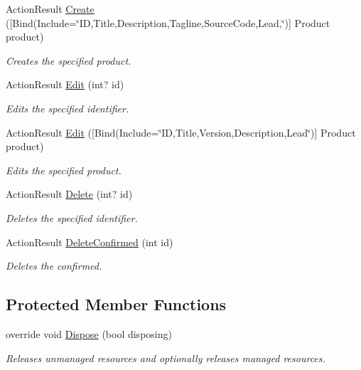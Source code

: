 \begin{DoxyCompactItemize}
Action\+Result \hyperlink{class_open_1_1_g_i_1_1hypermart_1_1_controllers_1_1_products_controller_aa3e20739b645a820cfea38aae81aff6a}{Create} (\mbox{[}Bind(Include=\char`\"{}ID,Title,Description,Tagline,Source\+Code,Lead,\char`\"{})\mbox{]} Product product)
\begin{DoxyCompactList}\small\item\em Creates the specified product. \end{DoxyCompactList}\item 
Action\+Result \hyperlink{class_open_1_1_g_i_1_1hypermart_1_1_controllers_1_1_products_controller_a203586ae68a295df5c7a037601e4b87a}{Edit} (int? id)
\begin{DoxyCompactList}\small\item\em Edits the specified identifier. \end{DoxyCompactList}\item 
Action\+Result \hyperlink{class_open_1_1_g_i_1_1hypermart_1_1_controllers_1_1_products_controller_a7b98181f09525a81fbce5ccb04000546}{Edit} (\mbox{[}Bind(Include=\char`\"{}ID,Title,Version,Description,Lead\char`\"{})\mbox{]} Product product)
\begin{DoxyCompactList}\small\item\em Edits the specified product. \end{DoxyCompactList}\item 
Action\+Result \hyperlink{class_open_1_1_g_i_1_1hypermart_1_1_controllers_1_1_products_controller_a2d8af2d76cdc650951f7f17f66778a62}{Delete} (int? id)
\begin{DoxyCompactList}\small\item\em Deletes the specified identifier. \end{DoxyCompactList}\item 
Action\+Result \hyperlink{class_open_1_1_g_i_1_1hypermart_1_1_controllers_1_1_products_controller_a043d74a7640e6cd249143de4c9641404}{Delete\+Confirmed} (int id)
\begin{DoxyCompactList}\small\item\em Deletes the confirmed. \end{DoxyCompactList}\end{DoxyCompactItemize}
\subsection*{Protected Member Functions}
\begin{DoxyCompactItemize}
\item 
override void \hyperlink{class_open_1_1_g_i_1_1hypermart_1_1_controllers_1_1_products_controller_a242db0a0ce58c01d24fc41273dcc393f}{Dispose} (bool disposing)
\begin{DoxyCompactList}\small\item\em Releases unmanaged resources and optionally releases managed resources. \end{DoxyCompactList}\end{DoxyCompactItemize}

